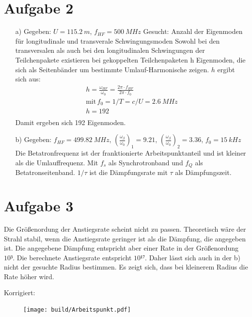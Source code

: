 \documentclass[11pt,a4paper]{article}
\begin{document}
	
    \section*{Aufgabe 2}
	\begin{itemize}
		\item[a)] 
			Gegeben: $U = \SI{115.2}{m}$, $f_{HF} = \SI{500}{MHz}$ \newline
			Gesucht: Anzahl der Eigenmoden für longitudinale und transverale Schwingungsmoden \newline
			Sowohl bei den transversalen als auch bei den longitudinalen Schwingungen der Teilchenpakete existieren bei gekoppelten Teilchenpaketen h Eigenmoden, 
			die sich als Seitenbänder um bestimmte Umlauf-Harmonische zeigen. $h$ ergibt sich aus:
			\begin{align*}
				h = \frac{\omega_{HF}}{\omega_0} = \frac{2\pi \cdot f_{HF}}{2\pi \cdot f_{0}} \\
				\text{mit} \, f_0 = 1/T = c/U = \SI{2.6}{MHz}\\
				h = 192 \\
			\end{align*}
			Damit ergeben sich 192 Eigenmoden.
		\item[b)]
			Gegeben: $f_{HF} = \SI{499.82}{MHz}$, $(\frac{\omega_{\beta}}{\omega_0})_{1} = 9.21$, \newline
			$(\frac{\omega_{\beta}}{\omega_0})_{2} = 3.36$, $f_{0} = \SI{15}{kHz}$  \newline
			Die Betatronfrequenz ist der franktionierte Arbeitspunktanteil und ist kleiner als die Umlauffrequenz.
			Mit $f_s$ als Synchrotronband und $f_Q$ als Betatronseitenband.
			$1/\tau$ ist die Dämpfungsrate mit $\tau$ als Dämpfungszeit.
 	\end{itemize}

	\section*{Aufgabe 3}

		Die Größenordung der Anstiegsrate scheint nicht zu passen. Theoretisch wäre der Strahl stabil, 
		wenn die Anstiegsrate geringer ist als die Dämpfung, die angegeben ist.
		Die angegebene Dämpfung entspricht aber einer Rate in der Größenordung $10³$.
		Die berechnete Anstiegsrate entspricht $10¹⁷$.
		Daher lässt sich auch in der b) nicht der gesuchte Radius bestimmen.
		Es zeigt sich, dass bei kleinerem Radius die Rate höher wird.

		\noindent Korrigiert:
		\begin{figure}
			\texttt{[image: build/Arbeitspunkt.pdf]}
		\end{figure}
\end{document}
